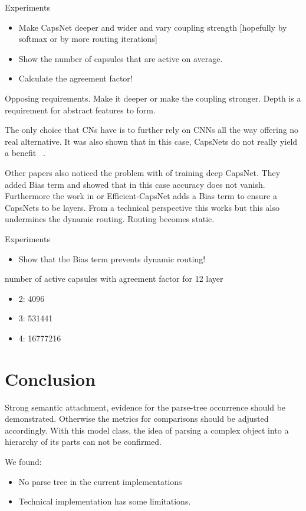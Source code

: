 \documentclass{article}
\begin{document}
Experiments
\begin{itemize}
	\item Make CapsNet deeper and wider and vary coupling strength [hopefully by softmax or by more routing iterations]
	\item Show the number of capsules that are active on average.
	\item Calculate the agreement factor!
\end{itemize}

Opposing requirements. Make it deeper or make the coupling stronger.
Depth is a requirement for abstract features to form.

The only choice that CNs have is to further rely on CNNs all the way offering no real alternative.
It was also shown that in this case, CapsNets do not really yield a benefit ~\cite{acml/PaikKK19}.

Other papers also noticed the problem with of training deep CapsNet. They added Bias term and showed that in this case accuracy does not vanish.
Furthermore the work in \cite{prl/PeerSR21} or Efficient-CapsNet adds a Bias term to ensure a CapsNets to be layers.
From a technical perspective this works but this also undermines the dynamic routing.
Routing becomes static.

Experiments
\begin{itemize}
	\item Show that the Bias term prevents dynamic routing!
\end{itemize}

number of active capsules with agreement factor for 12 layer
\begin{itemize}
	\item 2: 4096
	\item 3: 531441
	\item 4: 16777216
\end{itemize}

\section{Conclusion}

Strong semantic attachment, evidence for the parse-tree occurrence should be demonstrated. Otherwise the metrics for comparisons should be adjusted accordingly.
With this model class, the idea of parsing a complex object into a hierarchy of its parts can not be confirmed.

We found:
\begin{itemize}
	\item No parse tree in the current implementations
	\item Technical implementation has some limitations.
\end{itemize}
\end{document}
